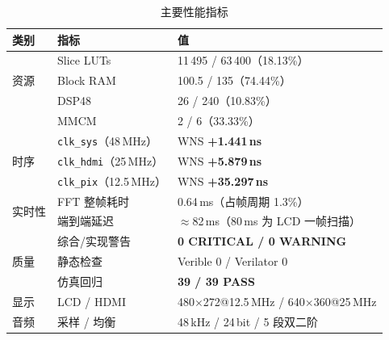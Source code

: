 \documentclass[withoutpreface,bwprint]{cumcmthesis}
\begin{document}
\begin{table}[H]
\centering
\caption{主要性能指标}
\label{tab:spec}
\begin{tabular}{lll}
\toprule[1.5pt]
\rowcolor{gray!25} 类别 & 指标 & 值 \\
\midrule[1pt]
\multirow{3}{*}{资源} & Slice LUTs & 11\,495 / 63\,400（18.13\%）\\
                      & Block RAM  & 100.5 / 135（74.44\%）\\
                      & DSP48      & 26 / 240（10.83\%）\\
                      & MMCM	   & 2 / 6（33.33\%） \\
\midrule[0.5pt]
\multirow{3}{*}{时序} & \texttt{clk\_sys}（48\,MHz）   & WNS \textbf{+1.441\,ns} \\
                      & \texttt{clk\_hdmi}（25\,MHz）  & WNS \textbf{+5.879\,ns} \\
                      & \texttt{clk\_pix}（12.5\,MHz） & WNS \textbf{+35.297\,ns} \\
\midrule[0.5pt]
\multirow{2}{*}{实时性} & FFT 整帧耗时 & 0.64\,ms（占帧周期 1.3\%）\\
                        & 端到端延迟   & $\approx$82\,ms（80\,ms 为 LCD 一帧扫描）\\
\midrule[0.5pt]
\multirow{3}{*}{质量} & 综合/实现警告 & \textbf{0 CRITICAL / 0 WARNING} \\
                      & 静态检查     & Verible 0 / Verilator 0 \\
                      & 仿真回归     & \textbf{39 / 39 PASS} \\
\midrule[0.5pt]
显示 & LCD / HDMI & 480$\times$272@12.5\,MHz / 640$\times$360@25\,MHz \\
音频 & 采样 / 均衡 & 48\,kHz / 24\,bit / 5 段双二阶 \\
\bottomrule[1.5pt]
\end{tabular}
\end{table}

%
\end{document}
